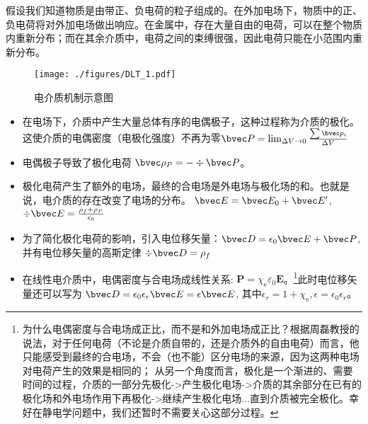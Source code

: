 
假设我们知道物质是由带正、负电荷的粒子组成的。在外加电场下，物质中的正、负电荷将对外加电场做出响应。在金属中，存在大量自由的电荷，可以在整个物质内重新分布；而在其余介质中，电荷之间的束缚很强，因此电荷只能在小范围内重新分布。

\begin{figure}[ht]
\centering
\texttt{[image: ./figures/DLT\_1.pdf]}
\caption{电介质机制示意图} \label{DLT_fig1}
\end{figure}
\begin{itemize}
\item 在电场下，介质中产生大量总体有序的电偶极子，这种过程称为介质的极化。这使介质的电偶密度（电极化强度）不再为零$\bvec P = \lim_{\Delta V \to 0} \frac{\sum \bvec p_i}{\Delta V}$ 
\item 电偶极子导致了极化电荷 $\bvec \rho_P = - \div \bvec P$。
\item 极化电荷产生了额外的电场，最终的合电场是外电场与极化场的和。也就是说，电介质的存在改变了电场的分布。 $\bvec E = \bvec E_0 + \bvec E'$, $\div \bvec E = \frac{\rho_f+\rho_P}{\epsilon_0}$
\item 为了简化极化电荷的影响，引入电位移矢量：$\bvec D = \epsilon_0 \bvec E + \bvec P$,并有电位移矢量的高斯定律 $\div \bvec D = \rho_f$ 
\item 在线性电介质中，电偶密度与合电场成线性关系: $\mathbf P=\chi_{\mathrm e} \varepsilon_{0} \mathbf E$。\footnote{为什么电偶密度与合电场成正比，而不是和外加电场成正比？根据周磊教授的说法，对于任何电荷（不论是介质自带的，还是介质外的自由电荷）而言，他只能感受到最终的合电场，不会（也不能）区分电场的来源，因为这两种电场对电荷产生的效果是相同的；
从另一个角度而言，极化是一个渐进的、需要时间的过程，介质的一部分先极化->产生极化电场->介质的其余部分在已有的极化场和外电场作用下再极化->继续产生极化电场...直到介质被完全极化。幸好在静电学问题中，我们还暂时不需要关心这部分过程。}此时电位移矢量还可以写为 $\bvec D = \epsilon_0 \epsilon_r \bvec E = \epsilon \bvec E $, 其中$\epsilon_r = 1+\chi_{\mathrm e}, \epsilon = \epsilon_0 \epsilon_r$。
\end{itemize}
